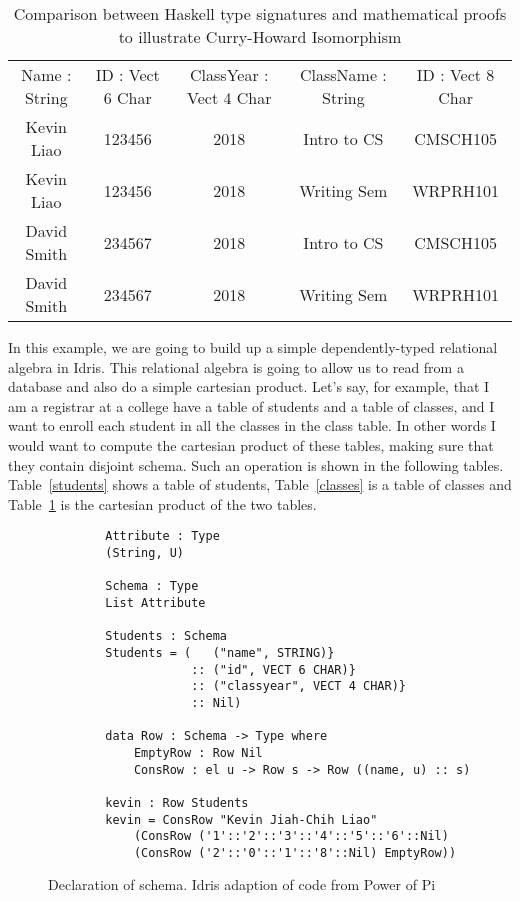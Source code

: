 \begin{table}[h]
    \centering
    \begin{tabular}{|c|c|c|c|c|}
        Name : String & ID : Vect 6 Char & ClassYear : Vect 4 Char & ClassName :
        String & ID : Vect 8 Char\\
        Kevin Liao    & 123456           & 2018       & Intro to CS & CMSCH105 \\
        Kevin Liao    & 123456           & 2018       & Writing Sem & WRPRH101 \\
        David Smith   & 234567           & 2018       & Intro to CS & CMSCH105 \\
        David Smith   & 234567           & 2018       & Writing Sem & WRPRH101 \\
    \end{tabular}
    \caption{Comparison between Haskell type signatures and mathematical proofs to illustrate Curry-Howard Isomorphism}
    \label{cartesian_product}
\end{table}

In this example, we are going to build up a simple dependently-typed relational
algebra in Idris. This relational algebra is going to allow us to read from a
database and also do a simple cartesian product. Let's say, for example, that I
am a registrar at a college have a table of students and a table of classes, and
I want to enroll each student in all the classes in the class table. In other
words I would want to compute the cartesian product of these tables, making sure
that they contain disjoint schema. Such an operation is shown in the following
tables. Table~\ref{students} shows a table of students, Table~\ref{classes} is a
table of classes and Table~\ref{cartesian_product} is the cartesian product of
the two tables.

\begin{figure}[h]
    \caption{Declaration of schema. Idris adaption of code from Power of Pi \protect\cite{power_of_pi}}
    \label{schema}
    \begin{lstlisting}
        Attribute : Type
        (String, U)

        Schema : Type
        List Attribute

        Students : Schema
        Students = (   ("name", STRING)}
                    :: ("id", VECT 6 CHAR)} 
                    :: ("classyear", VECT 4 CHAR)}
                    :: Nil)

        data Row : Schema -> Type where
            EmptyRow : Row Nil
            ConsRow : el u -> Row s -> Row ((name, u) :: s)

        kevin : Row Students
        kevin = ConsRow "Kevin Jiah-Chih Liao"
            (ConsRow ('1'::'2'::'3'::'4'::'5'::'6'::Nil)
            (ConsRow ('2'::'0'::'1'::'8'::Nil) EmptyRow))
    \end{lstlisting}
\end{figure}

